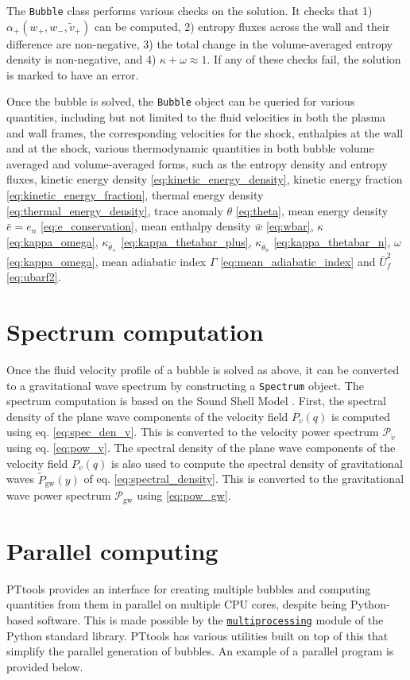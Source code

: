 The \verb|Bubble| class performs various checks on the solution.
It checks that
1) $\alpha_+(w_+, w_-, \tilde{v}_+)$ can be computed,
2) entropy fluxes across the wall and their difference are non-negative,
3) the total change in the volume-averaged entropy density is non-negative, and
4) $\kappa + \omega \approx 1$.
If any of these checks fail, the solution is marked to have an error.

Once the bubble is solved, the \verb|Bubble| object can be queried for various quantities,
including but not limited to the fluid velocities in both the plasma and wall frames,
the corresponding velocities for the shock,
enthalpies at the wall and at the shock,
various thermodynamic quantities in both bubble volume averaged and volume-averaged forms,
such as the entropy density and entropy fluxes,
kinetic energy density \eqref{eq:kinetic_energy_density},
kinetic energy fraction \eqref{eq:kinetic_energy_fraction},
thermal energy density \eqref{eq:thermal_energy_density},
trace anomaly $\theta$ \eqref{eq:theta},
mean energy density $\bar{e} = e_n$ \eqref{eq:e_conservation},
mean enthalpy density $\bar{w}$ \eqref{eq:wbar},
$\kappa$ \eqref{eq:kappa_omega},
$\kappa_{\bar{\theta}_+}$ \eqref{eq:kappa_thetabar_plus},
$\kappa_{\bar{\theta}_n}$ \eqref{eq:kappa_thetabar_n},
$\omega$ \eqref{eq:kappa_omega},
mean adiabatic index $\Gamma$ \eqref{eq:mean_adiabatic_index} and
$\bar{U}_f^2$ \eqref{eq:ubarf2}.


\section{Spectrum computation}
Once the fluid velocity profile of a bubble is solved as above,
it can be converted to a gravitational wave spectrum by constructing a \verb|Spectrum| object.
The spectrum computation is based on the Sound Shell Model \cite{hindmarsh_gw_pt_2019}.
First, the spectral density of the plane wave components of the velocity field $P_v(q)$ is computed using eq. \eqref{eq:spec_den_v}.
This is converted to the velocity power spectrum $\mathcal{P}_{\tilde{v}}$ using eq. \eqref{eq:pow_v}.
The spectral density of the plane wave components of the velocity field $P_v(q)$ is also used to compute the spectral density of gravitational waves $\tilde{P}_{\text{gw}}(y)$ of eq. \eqref{eq:spectral_density}.
This is converted to the gravitational wave power spectrum $\mathcal{P}_{\text{gw}}$ using \eqref{eq:pow_gw}.


\section{Parallel computing}
PTtools provides an interface for creating multiple bubbles and computing quantities from them in parallel on multiple CPU cores,
despite being Python-based software.
This is made possible by the
\href{https://docs.python.org/3/library/multiprocessing.html}{\texttt{multiprocessing}}
module of the Python standard library.
PTtools has various utilities built on top of this that simplify the parallel generation of bubbles.
An example of a parallel program is provided below.

